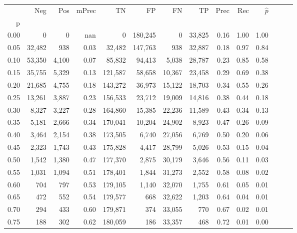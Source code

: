 \begin{tabular}{rrrrrrrrrrrrrr}
\toprule
{} &     Neg &    Pos & mPrec &       TN &       FP &      FN &      TP &  Prec &   Rec & $\hat{p}$ \\
p    &         &        &       &          &          &         &         &       &       &           \\
\midrule
0.00 &       0 &      0 &   nan &        0 &  180,245 &       0 &  33,825 &  0.16 &  1.00 &      1.00 \\
0.05 &  32,482 &    938 &  0.03 &   32,482 &  147,763 &     938 &  32,887 &  0.18 &  0.97 &      0.84 \\
0.10 &  53,350 &  4,100 &  0.07 &   85,832 &   94,413 &   5,038 &  28,787 &  0.23 &  0.85 &      0.58 \\
0.15 &  35,755 &  5,329 &  0.13 &  121,587 &   58,658 &  10,367 &  23,458 &  0.29 &  0.69 &      0.38 \\
0.20 &  21,685 &  4,755 &  0.18 &  143,272 &   36,973 &  15,122 &  18,703 &  0.34 &  0.55 &      0.26 \\
0.25 &  13,261 &  3,887 &  0.23 &  156,533 &   23,712 &  19,009 &  14,816 &  0.38 &  0.44 &      0.18 \\
0.30 &   8,327 &  3,227 &  0.28 &  164,860 &   15,385 &  22,236 &  11,589 &  0.43 &  0.34 &      0.13 \\
0.35 &   5,181 &  2,666 &  0.34 &  170,041 &   10,204 &  24,902 &   8,923 &  0.47 &  0.26 &      0.09 \\
0.40 &   3,464 &  2,154 &  0.38 &  173,505 &    6,740 &  27,056 &   6,769 &  0.50 &  0.20 &      0.06 \\
0.45 &   2,323 &  1,743 &  0.43 &  175,828 &    4,417 &  28,799 &   5,026 &  0.53 &  0.15 &      0.04 \\
0.50 &   1,542 &  1,380 &  0.47 &  177,370 &    2,875 &  30,179 &   3,646 &  0.56 &  0.11 &      0.03 \\
0.55 &   1,031 &  1,094 &  0.51 &  178,401 &    1,844 &  31,273 &   2,552 &  0.58 &  0.08 &      0.02 \\
0.60 &     704 &    797 &  0.53 &  179,105 &    1,140 &  32,070 &   1,755 &  0.61 &  0.05 &      0.01 \\
0.65 &     472 &    552 &  0.54 &  179,577 &      668 &  32,622 &   1,203 &  0.64 &  0.04 &      0.01 \\
0.70 &     294 &    433 &  0.60 &  179,871 &      374 &  33,055 &     770 &  0.67 &  0.02 &      0.01 \\
0.75 &     188 &    302 &  0.62 &  180,059 &      186 &  33,357 &     468 &  0.72 &  0.01 &      0.00 \\

\end{tabular}
